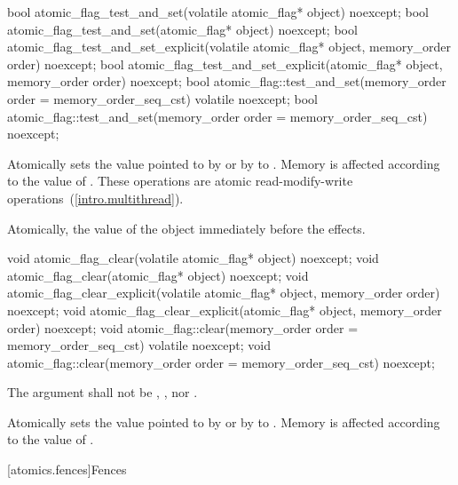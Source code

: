 %
%
%
\begin{itemdecl}
bool atomic_flag_test_and_set(volatile atomic_flag* object) noexcept;
bool atomic_flag_test_and_set(atomic_flag* object) noexcept;
bool atomic_flag_test_and_set_explicit(volatile atomic_flag* object, memory_order order) noexcept;
bool atomic_flag_test_and_set_explicit(atomic_flag* object, memory_order order) noexcept;
bool atomic_flag::test_and_set(memory_order order = memory_order_seq_cst) volatile noexcept;
bool atomic_flag::test_and_set(memory_order order = memory_order_seq_cst) noexcept;
\end{itemdecl}

\begin{itemdescr}
\pnum
\effects Atomically sets the value pointed to by  or by  to . Memory is affected according to the value of
. These operations are atomic read-modify-write operations~(\ref{intro.multithread}).

\pnum
\returns Atomically, the value of the object immediately before the effects.
\end{itemdescr}

%
%
%
\begin{itemdecl}
void atomic_flag_clear(volatile atomic_flag* object) noexcept;
void atomic_flag_clear(atomic_flag* object) noexcept;
void atomic_flag_clear_explicit(volatile atomic_flag* object, memory_order order) noexcept;
void atomic_flag_clear_explicit(atomic_flag* object, memory_order order) noexcept;
void atomic_flag::clear(memory_order order = memory_order_seq_cst) volatile noexcept;
void atomic_flag::clear(memory_order order = memory_order_seq_cst) noexcept;
\end{itemdecl}

\begin{itemdescr}
\pnum
\requires The  argument shall not be ,
, nor .

\pnum
\effects Atomically sets the value pointed to by  or by  to
. Memory is affected according to the value of .
\end{itemdescr}

[atomics.fences]{Fences}

